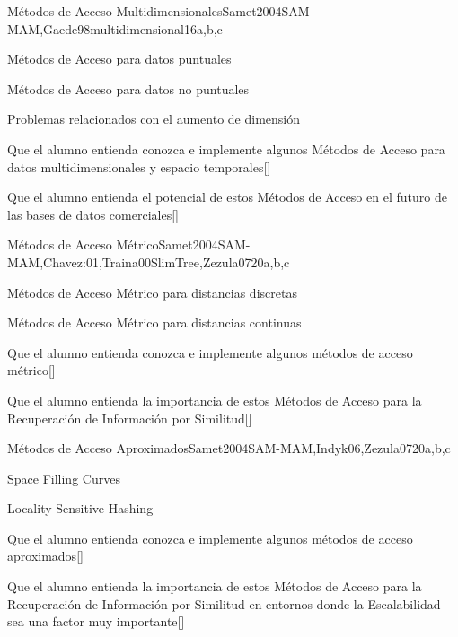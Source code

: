 \begin{syllabus}
\begin{unit}{Métodos de Acceso Multidimensionales}{}{Samet2004SAM-MAM,Gaede98multidimensional}{16}{a,b,c}
   \begin{topics}
         \item Métodos de Acceso para datos puntuales
         \item Métodos de Acceso para datos no puntuales
         \item Problemas relacionados con el aumento de dimensión
   \end{topics}
   \begin{learningoutcomes}
         \item Que el alumno entienda conozca e implemente algunos Métodos de Acceso para datos multidimensionales y espacio temporales[\Usage]
         \item Que el alumno entienda el potencial de estos Métodos de Acceso en el futuro de las bases de datos comerciales[\Usage]
   \end{learningoutcomes}
\end{unit}

\begin{unit}{Métodos de Acceso Métrico}{}{Samet2004SAM-MAM,Chavez:01,Traina00SlimTree,Zezula07}{20}{a,b,c}
   \begin{topics}
         \item Métodos de Acceso Métrico para distancias discretas
         \item Métodos de Acceso Métrico para distancias continuas
   \end{topics}
   \begin{learningoutcomes}
         \item Que el alumno entienda conozca e implemente algunos métodos de acceso métrico[\Usage]
         \item Que el alumno entienda la importancia de estos Métodos de Acceso para la Recuperación de Información por Similitud[\Usage]
   \end{learningoutcomes}
\end{unit}

\begin{unit}{Métodos de Acceso Aproximados}{}{Samet2004SAM-MAM,Indyk06,Zezula07}{20}{a,b,c}
   \begin{topics}
         \item Space Filling Curves
         \item Locality Sensitive Hashing
   \end{topics}
   \begin{learningoutcomes}
         \item Que el alumno entienda conozca e implemente algunos métodos de acceso aproximados[\Usage]
         \item Que el alumno entienda la importancia de estos Métodos de Acceso para la Recuperación de Información por Similitud en entornos donde la Escalabilidad sea una factor muy importante[\Usage]
   \end{learningoutcomes}
\end{unit}


\end{syllabus}
